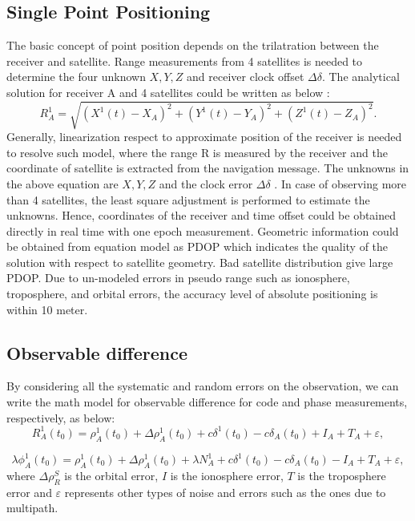 \subsection{Single Point Positioning}
The basic concept of point position depends on the trilatration between the receiver and satellite.
Range measurements from 4 satellites is needed to determine the four unknown $X, Y, Z$ and
receiver clock offset $\Delta \delta$. The analytical solution for receiver A and 4 
satellites could be written as below :
\begin{equation}
	\label{equ:single_point}
	R_{A}^{1} = \sqrt{(X^{1}(t)-X_{A})^{2}+(Y^{1}(t)-Y_{A})^{2}+(Z^{1}(t)-Z_{A})^{2}}.
\end{equation}
Generally, linearization respect to approximate position of the receiver is needed to resolve such
model, where the range R is measured by the receiver and the coordinate of satellite is extracted
from the navigation message. The unknowns in the above equation are $X, Y, Z$ and the clock
error $\Delta \delta$ . In case of observing more than 4 satellites, the least square adjustment
is performed  to estimate the unknowns.
Hence, coordinates of the receiver and time offset could be obtained directly in real time with
one epoch measurement. Geometric information could be obtained from equation model as
PDOP which indicates the quality of the solution with respect to satellite geometry. Bad satellite
distribution give large PDOP. Due to un-modeled errors in pseudo range such as ionosphere,
troposphere, and orbital errors, the accuracy level of absolute positioning is within 10 meter.

\subsection{Observable difference}
By considering all the systematic and random errors on the observation, we can write the math
model for observable difference for code and phase measurements, respectively, as below:
\begin{equation}
	\label{equ:diff_r}
	R^{1}_{A}(t_{0}) = \rho^{1}_{A}(t_{0})+\Delta \rho^{1}_{A}(t_{0}) + c \delta^{1}(t_{0})-
	c\delta_{A}(t_{0}) + I_{A} + T_{A} + \varepsilon,
\end{equation}

\begin{equation}
	\label{equ:diff_lambda}
	\lambda \phi^{1}_{A}(t_{0}) = \rho^{1}_{A}(t_{0}) + \Delta \rho^{1}_{A}(t_{0}) 
	+ \lambda N^{1}_{A} + c \delta^{1}(t_{0}) - c \delta_{A}(t_0) - I_{A} + T_{A} + \varepsilon,
\end{equation}
where $\Delta \rho_{R}^{S}$ is the orbital error, $I$ is the ionosphere error, $T$ is the
troposphere error and $\varepsilon$ represents other types of noise and errors such as the
ones due to multipath.

